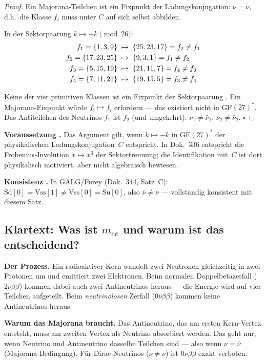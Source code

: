 \begin{proof}
Ein Majorana-Teilchen ist ein Fixpunkt der Ladungskonjugation: $\nu = \bar\nu$,
d.h.\ die Klasse $f_i$ muss unter $C$ auf sich selbst abbilden.

In der Sektorpaarung $k \mapsto -k \pmod{26}$:
\begin{align}
f_1 = \{1,3,9\} &\;\mapsto\; \{25,23,17\} = f_2 \neq f_1 \notag\\
f_2 = \{17,23,25\} &\;\mapsto\; \{9,3,1\} = f_1 \neq f_2 \notag\\
f_3 = \{5,15,19\} &\;\mapsto\; \{21,11,7\} = f_4 \neq f_3 \notag\\
f_4 = \{7,11,21\} &\;\mapsto\; \{19,15,5\} = f_3 \neq f_4 \notag
\end{align}

Keine der vier primitiven Klassen ist ein Fixpunkt der Sektorpaarung \BM.
Ein Majorana-Fixpunkt würde $f_i \mapsto f_i$ erfordern --- das existiert
nicht in GF$(27)^*$. Das Antiteilchen des Neutrinos $f_1$ ist $f_2$
(und umgekehrt): $\nu_1 \neq \bar\nu_1$, $\nu_2 \neq \bar\nu_2$. \qquad$\square$
\end{proof}

\textbf{Voraussetzung \SM.} Das Argument gilt, wenn $k \mapsto -k$ in GF$(27)^*$
der physikalischen Ladungskonjugation~$C$ entspricht. In Dok.~336 entspricht die
Frobenius-Involution $x \mapsto x^3$ der Sektortrennung; die Identifikation mit~$C$
ist dort physikalisch motiviert, aber nicht algebraisch bewiesen.

\textbf{Konsistenz \BM.} In GALG/Furey (Dok.~344, Satz~C):
$\mathrm{Sd}[0] = \mathrm{Vss}[1] \neq \mathrm{Vss}[0] = \mathrm{Su}[0]$,
also $\bar\nu \neq \nu$ --- vollständig konsistent mit diesem Satz.


\subsection*{Klartext: Was ist $m_{ee}$ und warum ist das entscheidend?}

\textbf{Der Prozess.} Ein radioaktiver Kern wandelt zwei Neutronen gleichzeitig
in zwei Protonen um und emittiert zwei Elektronen. Beim normalen Doppelbetazerfall
($2\nu\beta\beta$) kommen dabei auch zwei Antineutrinos heraus --- die Energie
wird auf vier Teilchen aufgeteilt. Beim \emph{neutrinolosen} Zerfall
($0\nu\beta\beta$) kommen keine Antineutrinos heraus.

\textbf{Warum das Majorana braucht.} Das Antineutrino, das am ersten Kern-Vertex
entsteht, muss am zweiten Vertex als Neutrino absorbiert werden. Das geht nur,
wenn Neutrino und Antineutrino dasselbe Teilchen sind --- also wenn
$\nu = \bar\nu$ (Majorana-Bedingung). Für Dirac-Neutrinos ($\nu \neq \bar\nu$)
ist $0\nu\beta\beta$ exakt verboten.

